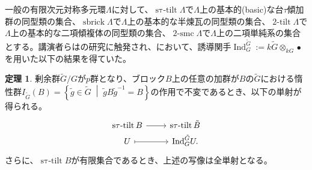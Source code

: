 \documentclass[dvipdfmx]{msjproc}
\newcommand{\setmid}{\; \middle|\;}
\newcommand{\induc}{{\operatorname{Ind}\nolimits}}
\newcommand{\stautilt}{\operatorname{\mathrm{s\tau-tilt}}}
\newcommand{\twotilt}{\operatorname{\mathrm{2-tilt}}}
\newcommand{\sbrick}{\operatorname{\mathrm{sbrick}}}
\newcommand{\twosmc}{\operatorname{\mathrm{2-smc}}}
\newcommand{\inertiagp}{I}
\theoremstyle{definition}
\newtheorem{theorem}{定理}
\begin{document}
一般の有限次元対称多元環\(\Lambda\)に対して、\(\stautilt \Lambda\)で\(\Lambda\)上の基本的(basic)な台\(\tau\)傾加群の同型類の集合、\(\sbrick \Lambda\)で\(\Lambda\)上の基本的な半煉瓦の同型類の集合、\(\twotilt \Lambda\)で\(\Lambda\)上の基本的な二項傾複体の同型類の集合、\(\twosmc \Lambda\)で\(\Lambda\)上の二項単純系の集合とする。講演者らは\cite{MR3856858}の研究に触発され、\cite{MR4243358}において、誘導関手\(\induc_G^{\tilde{G}}:=k\tilde{G}\otimes_{kG}\bullet\)を用いた以下の結果を得ていた。
\begin{theorem}\label{2021-11-18 06:55:10}
	剰余群\(\tilde{G}/G\)が\(p\)群となり、ブロック\(B\)上の任意の加群が\(B\)の\(\tilde{G}\)における惰性群\(\inertiagp_{\tilde{G}}(B)=\left\{ \tilde{g}\in \tilde{G}\setmid \tilde{g}B\tilde{g}^{-1}=B \right\}\)の作用で不変であるとき、以下の単射が得られる。
	\begin{equation}\label{stau corr 2021-09-07 13:51:09}
		\begin{tikzcd}[ampersand replacement=\&,row sep=1pt]
			\stautilt B \ar[r]\&\stautilt \tilde{B}\\
			U\ar[r,mapsto]\&\induc_G^{\tilde{G}} U.
		\end{tikzcd}
	\end{equation}
	さらに、\(\stautilt B\)が有限集合であるとき、上述の写像は全単射となる。
\end{theorem}
\end{document}
